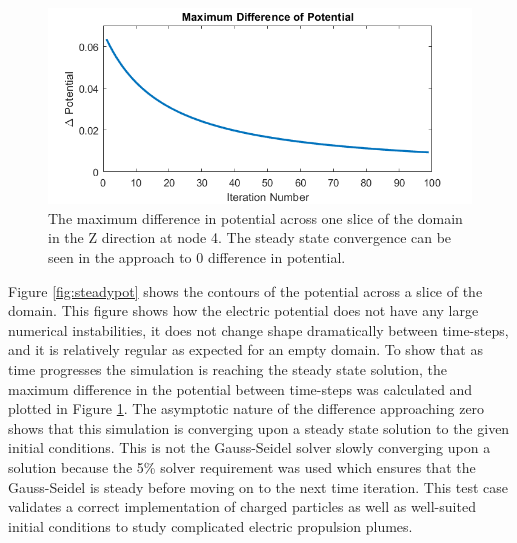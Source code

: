 \begin{figure}
    \includegraphics[width=.85\textwidth]{figures/steadyconvergance.png}
    \centering
    \caption[Maximum Difference in Potential]{The maximum difference in potential across one slice of the domain in the Z direction at node 4. The steady state convergence can be seen in the approach to 0 difference in potential.}
    \label{fig:steadyconvergance}
\end{figure}

\indent Figure \ref{fig:steadypot} shows the contours of the potential across a slice of the domain. This figure shows how the electric potential does not have any large numerical instabilities, it does not change shape dramatically between time-steps, and it is relatively regular as expected for an empty domain. To show that as time progresses the simulation is reaching the steady state solution, the maximum difference in the potential between time-steps was calculated and plotted in Figure \ref{fig:steadyconvergance}. The asymptotic nature of the difference approaching zero shows that this simulation is converging upon a steady state solution to the given initial conditions. This is not the Gauss-Seidel solver slowly converging upon a solution because the 5\% solver requirement was used which ensures that the Gauss-Seidel is steady before moving on to the next time iteration. This test case validates a correct implementation of charged particles as well as well-suited initial conditions to study complicated electric propulsion plumes. 


